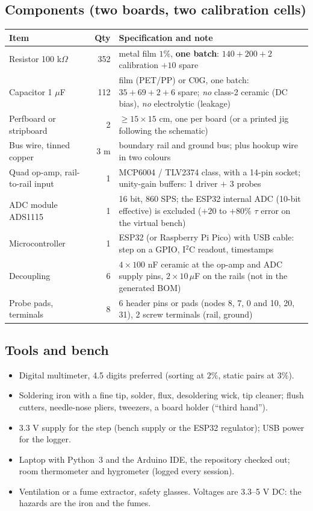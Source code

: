 \documentclass[11pt,a4paper]{article}
\begin{document}
\subsection*{Components (two boards, two calibration cells)}
\begin{center}\small
\begin{tabular}{lrp{8.6cm}}\toprule
Item & Qty & Specification and note \\ \midrule
Resistor 100 k$\Omega$ & 352 & metal film $1\%$, \textbf{one batch}: $140+200+2$ calibration $+10$ spare \\
Capacitor 1 $\mu$F & 112 & film (PET/PP) or C0G, one batch: $35+69+2+6$ spare; \emph{no} class-2 ceramic (DC bias), \emph{no} electrolytic (leakage) \\
Perfboard or stripboard & 2 & $\ge15\times15$ cm, one per board (or a printed jig following the schematic) \\
Bus wire, tinned copper & 3 m & boundary rail and ground bus; plus hookup wire in two colours \\
Quad op-amp, rail-to-rail input & 1 & MCP6004 / TLV2374 class, with a 14-pin socket; unity-gain buffers: 1 driver $+$ 3 probes \\
ADC module ADS1115 & 1 & 16 bit, 860 SPS; the ESP32 internal ADC (10-bit effective) is excluded ($+20$ to $+80\%$ $\tau$ error on the virtual bench) \\
Microcontroller & 1 & ESP32 (or Raspberry Pi Pico) with USB cable: step on a GPIO, I$^2$C readout, timestamps \\
Decoupling & 6 & $4\times100$ nF ceramic at the op-amp and ADC supply pins, $2\times10\,\mu$F on the rails (not in the generated BOM) \\
Probe pads, terminals & 8 & 6 header pins or pads (nodes 8, 7, 0 and 10, 20, 31), 2 screw terminals (rail, ground) \\ \bottomrule
\end{tabular}
\end{center}
\subsection*{Tools and bench}
\begin{itemize}
\item Digital multimeter, 4.5 digits preferred (sorting at $2\%$, static pairs at $3\%$).
\item Soldering iron with a fine tip, solder, flux, desoldering wick, tip cleaner; flush cutters, needle-nose pliers,
  tweezers, a board holder (``third hand'').
\item 3.3 V supply for the step (bench supply or the ESP32 regulator); USB power for the logger.
\item Laptop with Python~3 and the Arduino IDE, the repository checked out; room thermometer and hygrometer (logged
  every session).
\item Ventilation or a fume extractor, safety glasses. Voltages are 3.3--5 V DC: the hazards are the iron and the fumes.
\end{itemize}
\end{document}
